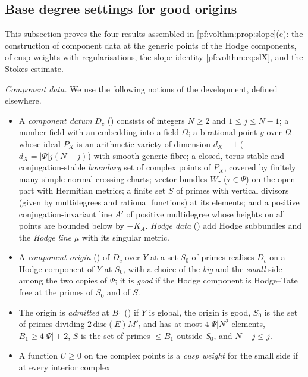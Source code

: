 \subsection{Base degree settings for good origins}\label{pf:volthm:sec:basesettings}

This subsection proves the four results assembled in \cref{pf:volthm:prop:slope}(c): the construction of
component data at the generic points of the Hodge components, of cusp weights with regularisations, the slope
identity \eqref{pf:volthm:eq:slX}, and the Stokes estimate.

\emph{Component data.} We use the following notions of the development, defined elsewhere.
\begin{itemize}
\item A \emph{component datum} $D_c$ () consists
of integers $N\ge2$ and $1\le j\le N-1$; a number field with an embedding into a field $\Omega$; a birational point $y$
over $\Omega$ whose ideal $P_X$ is an arithmetic variety of dimension $d_X+1$ ($d_X=|\Psi|j(N-j)$) with smooth generic
fibre; a closed, torus-stable and conjugation-stable \emph{boundary} set of complex points of $P_X$, covered by finitely
many simple normal crossing charts; vector bundles $W_\tau$ ($\tau\in\Psi$) on the open part with Hermitian metrics;
a finite set $S$ of primes with vertical divisors (given by multidegrees and rational functions) at its elements; and
a positive conjugation-invariant line $A'$ of positive multidegree whose heights on all points are bounded below by
$-K_A$. \emph{Hodge data} () add Hodge subbundles
and the \emph{Hodge line} $\mu$ with its singular metric.
\item A \emph{component origin} () of $D_c$ over $Y$ at a set
$S_0$ of primes realises $D_c$ on a Hodge component of $Y$ at $S_0$, with a choice of the \emph{big} and the
\emph{small} side among the two copies of $\Psi$; it is \emph{good} if the Hodge component is Hodge--Tate free at the
primes of $S_0$ and of $S$.
\item The origin is \emph{admitted} at $B_1$ () if $Y$ is
global, the origin is good, $S_0$ is the set of primes dividing $2\,\mathrm{disc}(E)M'_l$ and has at most $4|\Psi|N^2$
elements, $B_1\ge4|\Psi|+2$, $S$ is the set of primes $\le B_1$ outside $S_0$, and $N-j\le j$.
\item A function $U\ge0$ on the complex points is a \emph{cusp weight} for the small side if at every interior complex

\end{itemize}
